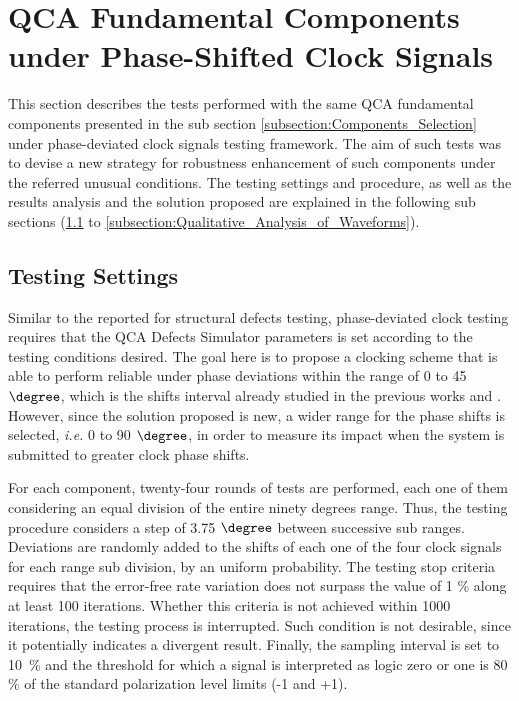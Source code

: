 
%

\section{QCA Fundamental Components under Phase-Shifted Clock Signals}

This section describes the tests performed with the same QCA fundamental components presented in the sub section \ref{subsection:Components_Selection} under phase-deviated clock signals testing framework. The aim of such tests was to devise a new strategy for robustness enhancement of such components under the referred unusual conditions. The testing settings and procedure, as well as the results analysis and the solution proposed are explained in the following sub sections (\ref{subsection:Clock_Testing_Settings} to \ref{subsection:Qualitative_Analysis_of_Waveforms}).

\subsection{Testing Settings}
\label{subsection:Clock_Testing_Settings}

Similar to the reported for structural defects testing, phase-deviated clock testing requires that the QCA Defects Simulator parameters is set according to the testing conditions desired. The goal here is to propose a clocking scheme that is able to perform reliable under phase deviations within the range of 0 to 45 $\degree$, which is the shifts interval already studied in the previous works \cite{ottavi07} and \cite{karim09}. However, since the solution proposed is new, a wider range for the phase shifts is selected, \textit{i.e.} 0 to 90 $\degree$, in order to measure its impact when the system is submitted to greater clock phase shifts.

For each component, twenty-four rounds of tests are performed, each one of them considering an equal division of the entire ninety degrees range. Thus, the testing procedure considers a step of 3.75 $\degree$ between successive sub ranges. Deviations are randomly added to the shifts of each one of the four clock signals for each range sub division, by an uniform probability. The testing stop criteria requires that the error-free rate variation does not surpass the value of 1 \% along at least 100 iterations. Whether this criteria is not achieved within 1000 iterations, the testing process is interrupted. Such condition is not desirable, since it potentially indicates a divergent result. Finally, the sampling interval is set to 10~\% and the threshold for which a signal is interpreted as logic zero or one is 80 \% of the standard polarization level limits (-1 and +1).

